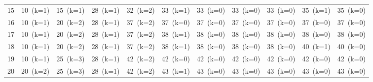 \documentclass[12pt]{article}
\begin{document}
\begin{landscape}
\begin{longtable}{ccccccccccc}
15 & \cellcolor{green!40}10~(k=1) & \cellcolor{yellow!50}15~(k=1) & \cellcolor{green!40}28~(k=1) & \cellcolor{green!40}32~(k=2) & \cellcolor{green!40}33~(k=1) & \cellcolor{red!20}33~(k=0) & \cellcolor{red!20}33~(k=0) & \cellcolor{red!20}33~(k=0) & \cellcolor{green!40}35~(k=1) & \cellcolor{red!20}35~(k=0) \\
16 & \cellcolor{green!40}10~(k=1) & \cellcolor{green!40}20~(k=2) & \cellcolor{green!40}28~(k=1) & \cellcolor{green!40}37~(k=2) & \cellcolor{red!20}37~(k=0) & \cellcolor{red!20}37~(k=0) & \cellcolor{red!20}37~(k=0) & \cellcolor{red!20}37~(k=0) & \cellcolor{red!20}37~(k=0) & \cellcolor{red!20}37~(k=0) \\
17 & \cellcolor{green!40}10~(k=1) & \cellcolor{green!40}20~(k=2) & \cellcolor{green!40}28~(k=1) & \cellcolor{green!40}37~(k=2) & \cellcolor{green!40}38~(k=1) & \cellcolor{red!20}38~(k=0) & \cellcolor{red!20}38~(k=0) & \cellcolor{red!20}38~(k=0) & \cellcolor{red!20}38~(k=0) & \cellcolor{red!20}38~(k=0) \\
18 & \cellcolor{green!40}10~(k=1) & \cellcolor{green!40}20~(k=2) & \cellcolor{green!40}28~(k=1) & \cellcolor{green!40}37~(k=2) & \cellcolor{green!40}38~(k=1) & \cellcolor{red!20}38~(k=0) & \cellcolor{red!20}38~(k=0) & \cellcolor{red!20}38~(k=0) & \cellcolor{green!40}40~(k=1) & \cellcolor{red!20}40~(k=0) \\
19 & \cellcolor{green!40}10~(k=1) & \cellcolor{green!40}25~(k=3) & \cellcolor{green!40}28~(k=1) & \cellcolor{green!40}42~(k=2) & \cellcolor{red!20}42~(k=0) & \cellcolor{red!20}42~(k=0) & \cellcolor{red!20}42~(k=0) & \cellcolor{red!20}42~(k=0) & \cellcolor{red!20}42~(k=0) & \cellcolor{red!20}42~(k=0) \\
20 & \cellcolor{green!40}20~(k=2) & \cellcolor{green!40}25~(k=3) & \cellcolor{green!40}28~(k=1) & \cellcolor{green!40}42~(k=2) & \cellcolor{green!40}43~(k=1) & \cellcolor{red!20}43~(k=0) & \cellcolor{red!20}43~(k=0) & \cellcolor{red!20}43~(k=0) & \cellcolor{yellow!50}43~(k=0) & \cellcolor{red!20}43~(k=0) \\
\bottomrule
\end{longtable}
\end{landscape}
\end{document}

